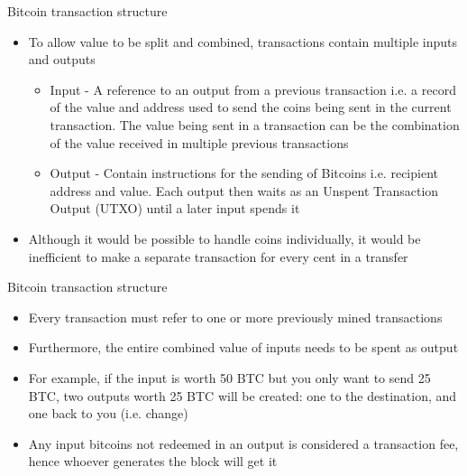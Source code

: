 \documentclass[11pt]{beamer}
\begin{document}


\begin{frame}{Bitcoin transaction structure}
	\begin{itemize}
		\item To allow value to be split and combined, transactions contain multiple inputs and outputs
		\begin{itemize}
			\item Input - A reference to an output from a previous transaction i.e. a record of the value and address used to send the coins being sent in the current transaction. The value being sent in a transaction can be the combination of the value received in multiple previous transactions
			\item Output - Contain instructions for the sending of Bitcoins i.e. recipient address and value. Each output then waits as an Unspent Transaction Output (UTXO) until a later input spends it
		\end{itemize}
		\item Although it would be possible to handle coins individually, it would be inefficient to make a separate transaction for every cent in a transfer
	\end{itemize}
\end{frame}


\begin{frame}{Bitcoin transaction structure}
	\begin{itemize}
		\item Every transaction must refer to one or more previously mined transactions
		\item Furthermore, the entire combined value of inputs needs to be spent as output
		\item For example, if the input is worth 50 BTC but you only want to send 25 BTC, two outputs worth 25 BTC will be created: one to the destination, and one back to you (i.e. change)
		\item Any input bitcoins not redeemed in an output is considered a transaction fee, hence whoever generates the block will get it
	\end{itemize}
\end{frame}

\end{document}
